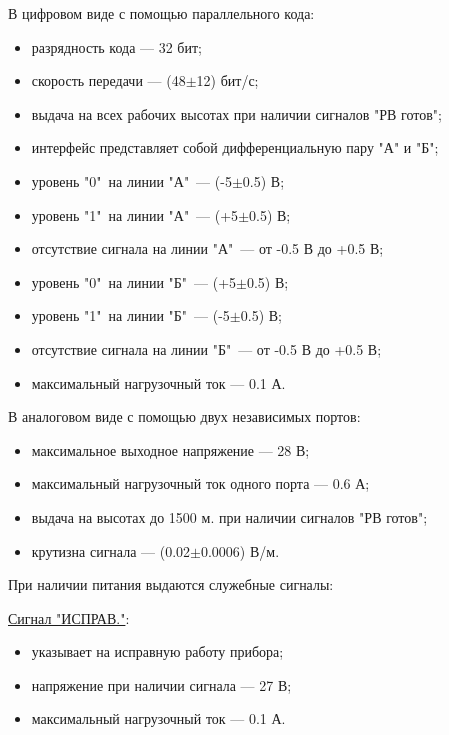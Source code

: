 \documentclass[utf8x, 14pt, oneside, a4paper]{article}
\begin{document}
			\vspace{\baselineskip}
			В цифровом виде с помощью параллельного кода:
			\begin{itemize}
				\item разрядность кода --- 32 бит;
				\item скорость передачи --- (48$\pm$12) бит/с;
				\item выдача на всех рабочих высотах при наличии сигналов "РВ готов";
				\item интерфейс представляет собой дифференциальную пару "А" и "Б";
				\item уровень "0"\ на линии "А"\ --- (-5$\pm$0.5) В;
				\item уровень "1"\ на линии "А"\ --- (+5$\pm$0.5) В;
				\item отсутствие сигнала на линии "А"\ --- от -0.5 В до +0.5 В;
				\item уровень "0"\ на линии "Б"\ --- (+5$\pm$0.5) В;
				\item уровень "1"\ на линии "Б"\ --- (-5$\pm$0.5) В;
				\item отсутствие сигнала на линии "Б"\ --- от -0.5 В до +0.5 В;
				\item максимальный нагрузочный ток --- 0.1 А.
			\end{itemize}
			
			\vspace{\baselineskip}
			В аналоговом виде с помощью двух независимых портов:
			\begin{itemize}
				\item максимальное выходное напряжение --- 28 В;
				\item максимальный нагрузочный ток одного порта --- 0.6 А;
				\item выдача на высотах до 1500 м. при наличии сигналов "РВ готов";
				\item крутизна сигнала --- (0.02$\pm$0.0006) В/м.
			\end{itemize}
			
			\vspace{\baselineskip}
			При наличии питания выдаются служебные сигналы:
			
			\uline{Сигнал "ИСПРАВ."}:
			\begin{itemize}
				\item указывает на исправную работу прибора;
				\item напряжение при наличии сигнала --- 27 В;
				\item максимальный нагрузочный ток --- 0.1 А.
			\end{itemize}
			
\end{document}
